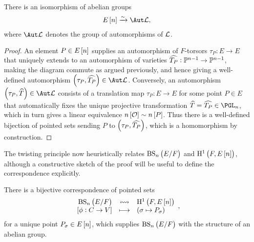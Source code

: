 \begin{proposition}
\label{prop:bsisomorphism}
There is an isomorphism of abelian groups
$$ E\sbr{n} \xrightarrow{\sim} \Aut \LLL, $$
where $ \Aut \LLL $ denotes the group of automorphisms of $ \mathcal{L} $.
\end{proposition}

\begin{proof}
An element $ P \in E\sbr{n} $ supplies an automorphism of $ F $-torsors $ \tau_P : E \to E $ that uniquely extends to an automorphism of varieties $ \widehat{T_P} : \mathbb{P}^{n - 1} \to \mathbb{P}^{n - 1} $, making the diagram commute as argued previously, and hence giving a well-defined automorphism $ \br{\tau_P, \widehat{T_P}} \in \Aut \LLL $. Conversely, an automorphism $ \br{\tau_P, \widehat{T}} \in \Aut \LLL $ consists of a translation map $ \tau_P : E \to E $ for some point $ P \in E $ that automatically fixes the unique projective transformation $ \widehat{T} = \widehat{T_P} \in \PGL_n $, which in turn gives a linear equivalence $ n\sbr{\OOO} \sim n\sbr{P} $. Thus there is a well-defined bijection of pointed sets sending $ P $ to $ \br{\tau_P, \widehat{T_P}} $, which is a homomorphism by construction.
\end{proof}

\pagebreak

The twisting principle now heuristically relates $ \BS{F} $ and $ \HE[n]{F} $, although a constructive sketch of the proof will be useful to define the correspondence explicitly.

\begin{proposition}
\label{prop:bscorrespondence}
There is a bijective correspondence of pointed sets
$$ \bijection{\BS{F}}{\HE[n]{F}}{\sbr{\phi : C \to V}}{\br{\sigma \mapsto P_\sigma}}, $$
for a unique point $ P_\sigma \in E\sbr{n} $, which supplies $ \BS{F} $ with the structure of an abelian group.
\end{proposition}

